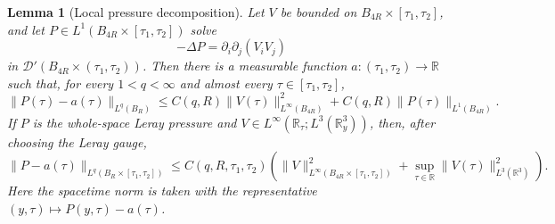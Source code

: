 \documentclass[11pt]{amsart}
\theoremstyle{plain}
\newtheorem{lemma}[theorem]{Lemma}
\theoremstyle{definition}
\theoremstyle{remark}
\numberwithin{equation}{section}
\begin{document}
\begin{lemma}[Local pressure decomposition]\label{lem:pressure-decomp}
Let \(V\) be bounded on \(B_{4R}\times[\tau_1,\tau_2]\), and let
\(P\in L^1(B_{4R}\times[\tau_1,\tau_2])\) solve
\[
   -\Delta P=\partial_i\partial_j(V_iV_j)
\]
in \(\mathcal D'(B_{4R}\times(\tau_1,\tau_2))\).  Then there is a measurable
function \(a:(\tau_1,\tau_2)\to\mathbb R\) such that,
for every \(1<q<\infty\) and almost every \(\tau\in[\tau_1,\tau_2]\),
\[
   \|P(\tau)-a(\tau)\|_{L^q(B_R)}
   \le C(q,R)\|V(\tau)\|_{L^\infty(B_{4R})}^2
   +C(q,R)\|P(\tau)\|_{L^1(B_{4R})}.
\]
If \(P\) is the whole-space Leray pressure and
\(V\in L^\infty(\mathbb R_\tau;L^3(\mathbb R^3_y))\),
then, after choosing the Leray gauge,
\[
   \|P-a(\tau)\|_{L^q(B_R\times[\tau_1,\tau_2])}
   \le C(q,R,\tau_1,\tau_2)
      \left(
      \|V\|_{L^\infty(B_{4R}\times[\tau_1,\tau_2])}^2
      +\sup_{\tau\in\mathbb R}\|V(\tau)\|_{L^3(\mathbb R^3)}^2
      \right).
\]
Here the spacetime norm is taken with the representative
\((y,\tau)\mapsto P(y,\tau)-a(\tau)\).
\end{lemma}
\end{document}
